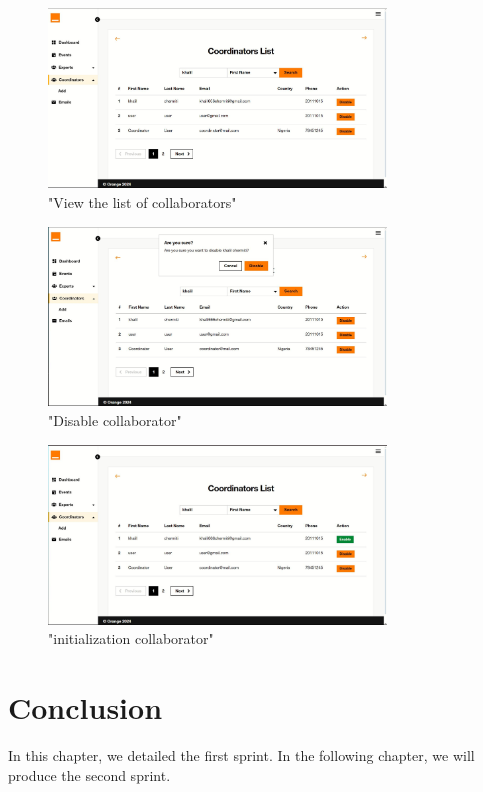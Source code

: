 \begin{figure}[h!]
    \centering
    \includegraphics[width=0.8\textwidth]{images/disable.JPG}
    \caption{"View the list of collaborators"}
    \label{fig:"View the list of collaborators"}
\end{figure}
\begin{figure}[h!]
    \centering
    \includegraphics[width=0.8\textwidth]{images/khal.JPG}
    \caption{"Disable collaborator"}
    \label{fig:"Disable collaborator"}
\end{figure}

\begin{figure}[h!]
    \centering
    \includegraphics[width=0.8\textwidth]{images/last.JPG}
    \caption{"initialization collaborator"}
    \label{fig:"initialization collaborator"}
\end{figure}
 \section{Conclusion}
 In this chapter, we detailed the first sprint. In the following chapter, we will produce the second sprint.
